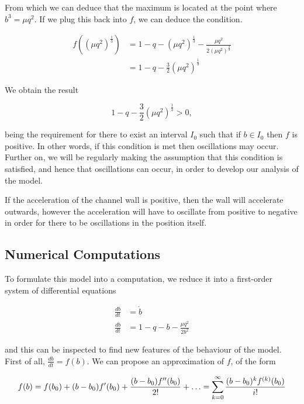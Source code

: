 \documentclass{article}
\begin{document}
From which we can deduce that the maximum is located at the point where $b^3 = \mu q^2$.
If we plug this back into $f$, we can deduce the condition.

\begin{align*}
    f((\mu q^2)^{\frac{1}{3}}) &= 1 - q - (\mu q^2)^{\frac{1}{3}} - \frac{\mu q^2}{2(\mu q^2)^{\frac{2}{3}}} \\
    &= 1 - q - \frac{3}{2}(\mu q^2)^{\frac{1}{3}}
\end{align*}

We obtain the result

\begin{equation}
    1 - q - \frac{3}{2}(\mu q^2)^{\frac{1}{3}} > 0,
    \label{eqn:osc_condition}
\end{equation}

being the requirement for there to exist an interval $I_0$
such that if $b\in I_0$ then $f$ is positive.
In other words, if this condition is met then oscillations may occur.
Further on, we will be regularly making the assumption that this condition is satisfied,
and hence that oscillations can occur,
in order to develop our analysis of the model.

If the acceleration of the channel wall is positive, then the wall will accelerate outwards,
however the acceleration will have to oscillate from positive to negative in order for there to be oscillations in the position itself.

\subsection{Numerical Computations}

To formulate this model into a computation, we reduce it into a first-order system of differential equations

\begin{align}
    \frac{db}{dt} &= \dot{b} \\
    \frac{d\dot{b}}{dt} &= 1 - q - b - \frac{\mu q^2}{2b^2}
\end{align}

and this can be inspected to find new features of the behaviour of the model.
First of all, $\frac{d\dot{b}}{dt} = f(b)$.
We can propose an approximation of $f$, of the form

\begin{equation*}
    f(b) = f(b_0) + (b-b_0)f'(b_0) + \frac{(b-b_0)f''(b_0)}{2!} + \mathellipsis = \sum_{k=0}^\infty\frac{(b-b_0)^{k}f^{(k)}(b_0)}{i!}
\end{equation*}
\end{document}
